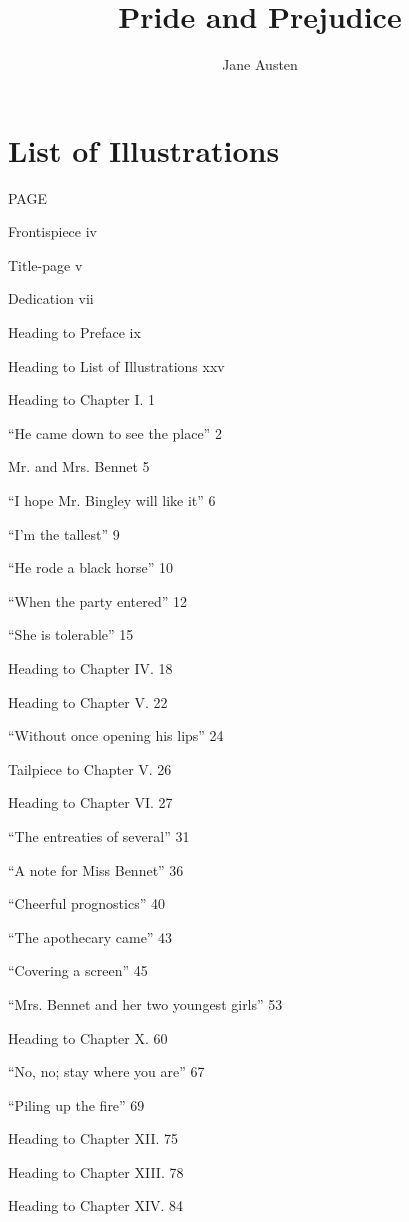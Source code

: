 \documentclass[11pt, statementpaper, twoside, openright]{memoir}
\title{Pride and Prejudice}
\author{Jane Austen}
\date{} %
\begin{document}
\frontmatter
\maketitle
\thispagestyle{empty} %


\tableofcontents

\chapter{List of Illustrations}
PAGE

Frontispiece iv

Title-page v

Dedication vii

Heading to Preface ix

Heading to List of Illustrations xxv

Heading to Chapter I. 1

``He came down to see the place'' 2

Mr. and Mrs. Bennet 5

``I hope Mr. Bingley will like it'' 6

``I'm the tallest'' 9

``He rode a black horse'' 10

``When the party entered'' 12

``She is tolerable'' 15

Heading to Chapter IV. 18

Heading to Chapter V. 22

``Without once opening his lips'' 24

Tailpiece to Chapter V. 26

Heading to Chapter VI. 27

``The entreaties of several'' 31

``A note for Miss Bennet'' 36

``Cheerful prognostics'' 40

``The apothecary came'' 43

``Covering a screen'' 45

``Mrs. Bennet and her two youngest girls'' 53

Heading to Chapter X. 60

``No, no; stay where you are'' 67

``Piling up the fire'' 69

Heading to Chapter XII. 75

Heading to Chapter XIII. 78

Heading to Chapter XIV. 84
\end{document}
